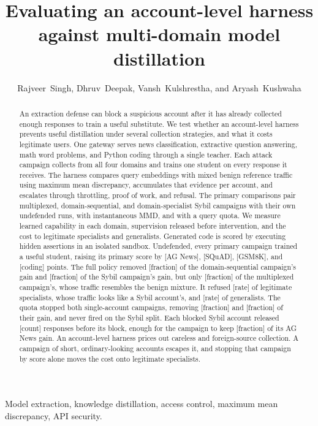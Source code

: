 \documentclass[journal]{IEEEtran}
\title{Evaluating an account-level harness against multi-domain model distillation}
\author{Rajveer~Singh, Dhruv~Deepak, Vansh~Kulshrestha, and Aryash~Kushwaha}
\newcommand{\tbd}[1]{\textcolor{red!65!black}{[#1]}}
\begin{document}
\maketitle

\begin{abstract}
An extraction defense can block a suspicious account after it has already collected enough responses to train a useful substitute. We test whether an account-level harness prevents useful distillation under several collection strategies, and what it costs legitimate users. One gateway serves news classification, extractive question answering, math word problems, and Python coding through a single teacher. Each attack campaign collects from all four domains and trains one student on every response it receives. The harness compares query embeddings with mixed benign reference traffic using maximum mean discrepancy, accumulates that evidence per account, and escalates through throttling, proof of work, and refusal. The primary comparisons pair multiplexed, domain-sequential, and domain-specialist Sybil campaigns with their own undefended runs, with instantaneous MMD, and with a query quota. We measure learned capability in each domain, supervision released before intervention, and the cost to legitimate specialists and generalists. Generated code is scored by executing hidden assertions in an isolated sandbox. Undefended, every primary campaign trained a useful student, raising its primary score by \tbd{AG News}, \tbd{SQuAD}, \tbd{GSM8K}, and \tbd{coding} points. The full policy removed \tbd{fraction} of the domain-sequential campaign's gain and \tbd{fraction} of the Sybil campaign's gain, but only \tbd{fraction} of the multiplexed campaign's, whose traffic resembles the benign mixture. It refused \tbd{rate} of legitimate specialists, whose traffic looks like a Sybil account's, and \tbd{rate} of generalists. The quota stopped both single-account campaigns, removing \tbd{fraction} and \tbd{fraction} of their gain, and never fired on the Sybil split. Each blocked Sybil account released \tbd{count} responses before its block, enough for the campaign to keep \tbd{fraction} of its AG News gain. An account-level harness prices out careless and foreign-source collection. A campaign of short, ordinary-looking accounts escapes it, and stopping that campaign by score alone moves the cost onto legitimate specialists.
\end{abstract}
\begin{IEEEkeywords}
Model extraction, knowledge distillation, access control, maximum mean discrepancy, API security.
\end{IEEEkeywords}
\end{document}
